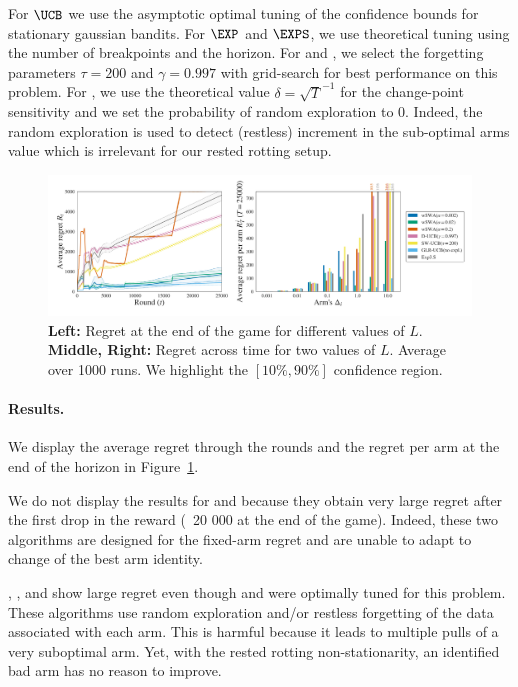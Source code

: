For $\UCB$ we use the asymptotic optimal tuning of the confidence bounds for stationary gaussian bandits. For $\EXP$ and $\EXPS$, we use theoretical tuning using the number of breakpoints and the horizon. For \SWUCB and \DUCB, we select the forgetting parameters $\tau=200$ and $\gamma = 0.997$ with grid-search for best performance on this problem. For \GLRUCB, we use the theoretical value $\delta = \sqrt{T}^{-1}$ for the change-point sensitivity and we set the probability of random exploration to $0$. Indeed, the random exploration is used to detect (restless) increment in the sub-optimal arms value which is irrelevant for our rested rotting setup.


\begin{figure}[t]
\centering
\includegraphics[width = 0.99 \textwidth]{2.1Rested/fig/fig2_SWA.pdf}
\caption{\textbf{Left:} Regret at the end of the game for different values of $L$. \textbf{Middle, Right:} Regret across time for two values of $L$. Average over 1000 runs. We highlight the $\left[10\%, 90\%\right]$ confidence region.}
\label{fig:SWA2}
\end{figure}

\paragraph{Results.} We display the average regret through the rounds and the regret per arm at the end of the horizon in Figure~\ref{fig:SWA2}.

We do not display the results for \UCB and \EXP because they obtain very large regret after the first drop in the reward (~20 000 at the end of the game). Indeed, these two algorithms are designed for the fixed-arm regret and are unable to adapt to change of the best arm identity. 
 
\SWUCB, \DUCB, and \EXPS show large regret even though \SWUCB and \DUCB were optimally tuned for this problem. These algorithms use random exploration and/or restless forgetting of the data associated with each arm. This is harmful because it leads to multiple pulls of a very suboptimal arm. Yet, with the rested rotting non-stationarity, an identified bad arm has no reason to improve.
 
